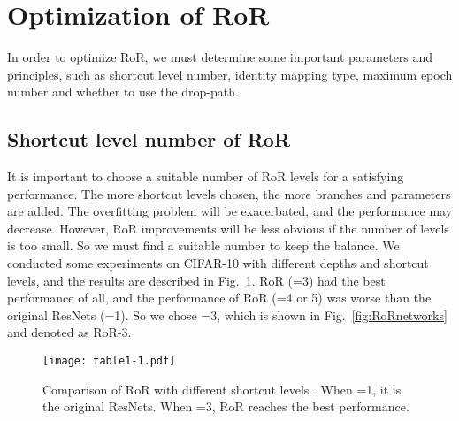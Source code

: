 \documentclass[journal]{IEEEtran}
\begin{document}
\section{Optimization of RoR}
In order to optimize RoR, we must determine some important parameters and principles, such as shortcut level number, identity mapping type, maximum epoch number and whether to use the drop-path.
\subsection{Shortcut level number of RoR}
It is important to choose a suitable number of RoR levels for a satisfying performance. The more shortcut levels chosen, the more branches and parameters are added. The overfitting problem will be exacerbated, and the performance may decrease. However, RoR improvements will be less obvious if the number of levels is too small. So we must find a suitable number to keep the balance. We conducted some experiments on CIFAR-10 with different depths and shortcut levels, and the results are described in Fig.~\ref{fig:shortlevel}. RoR (=3) had the best performance of all, and the performance of RoR (=4 or 5) was worse than the original ResNets (=1). So we chose =3, which is shown in Fig.~\ref{fig:RoRnetworks} and denoted as RoR-3.
\begin{figure}
\centering
\texttt{[image: table1-1.pdf]}
\caption{Comparison of RoR with different shortcut levels . When =1, it is the original ResNets. When =3, RoR reaches the best performance. }
\label{fig:shortlevel}
\end{figure}
\end{document}
